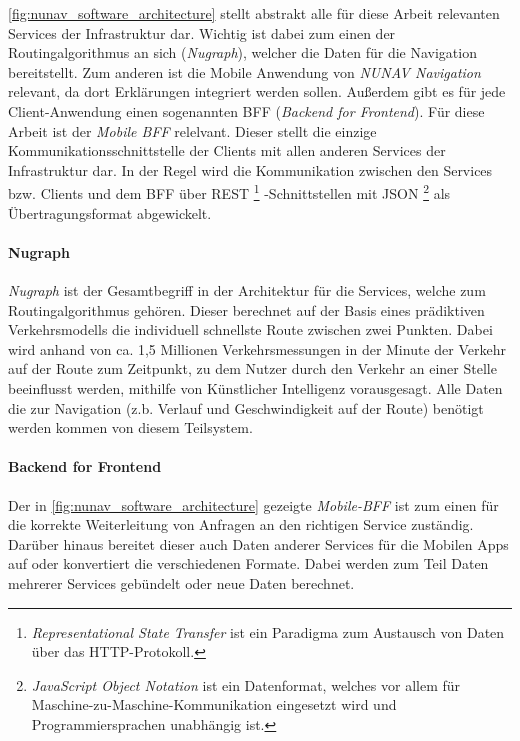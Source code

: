 \autoref{fig:nunav_software_architecture} stellt abstrakt alle für diese Arbeit relevanten Services der Infrastruktur dar. Wichtig ist dabei zum einen der Routingalgorithmus an sich (\textit{Nugraph}), welcher die Daten für die Navigation bereitstellt. Zum anderen ist die Mobile Anwendung von \textit{NUNAV Navigation} relevant, da dort Erklärungen integriert werden sollen. Außerdem gibt es für jede Client-Anwendung einen sogenannten BFF (\textit{Backend for Frontend}). Für diese Arbeit ist der \textit{Mobile BFF} relelvant. Dieser stellt die einzige Kommunikationsschnittstelle der Clients mit allen anderen Services der Infrastruktur dar. In der Regel wird die Kommunikation zwischen den Services bzw. Clients und dem BFF über REST
\footnote{\textit{Representational State Transfer} ist ein Paradigma zum Austausch von Daten über das HTTP-Protokoll.}
-Schnittstellen mit JSON
\footnote{\textit{JavaScript Object Notation} ist ein Datenformat, welches vor allem für Maschine-zu-Maschine-Kommunikation eingesetzt wird und Programmiersprachen unabhängig ist.}
als Übertragungsformat abgewickelt. 

\paragraph{Nugraph} \textit{Nugraph} ist der Gesamtbegriff in der Architektur für die Services, welche zum Routingalgorithmus gehören. Dieser berechnet auf der Basis eines prädiktiven Verkehrsmodells die individuell schnellste Route zwischen zwei Punkten. Dabei wird anhand von ca. 1,5 Millionen Verkehrsmessungen
 in der Minute der Verkehr auf der Route zum Zeitpunkt, zu dem Nutzer durch den Verkehr an einer Stelle beeinflusst werden, mithilfe von Künstlicher Intelligenz vorausgesagt. Alle Daten die zur Navigation (z.b. Verlauf und Geschwindigkeit auf der Route) benötigt werden kommen von diesem Teilsystem.

\paragraph{Backend for Frontend} Der in \autoref{fig:nunav_software_architecture} gezeigte \textit{Mobile-BFF} ist zum einen für die korrekte Weiterleitung von Anfragen an den richtigen Service zuständig. Darüber hinaus bereitet dieser auch Daten anderer Services für die Mobilen Apps auf oder konvertiert die verschiedenen Formate. Dabei werden zum Teil Daten mehrerer Services gebündelt oder neue Daten berechnet. 

